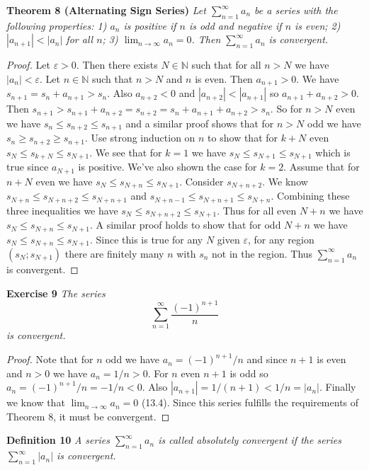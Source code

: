 \documentclass{article}
\begin{document}
\begin{flushleft}
\textbf{Theorem 8 (Alternating Sign Series)}
\textsl{Let $\sum_{n=1}^{\infty} a_n$ be a series with the following properties:
1) $a_n$ is positive if $n$ is odd and negative if $n$ is even;
2) $|a_{n+1}| < |a_n|$ for all $n$;
3) $\lim_{n \rightarrow \infty} a_n = 0$.
Then $\sum_{n=1}^{\infty} a_n$ is convergent.}
\begin{proof}
Let $\varepsilon > 0$. Then there exists $N \in \mathbb{N}$ such that for all $n > N$ we have $|a_n| < \varepsilon$. Let $n \in \mathbb{N}$ such that $n > N$ and $n$ is even. Then $a_{n+1} > 0$. We have $s_{n+1} = s_{n} + a_{n+1} > s_{n}$. Also $a_{n+2} < 0$ and $|a_{n+2}| < |a_{n+1}|$ so $a_{n+1} + a_{n+2} > 0$. Then $s_{n+1} > s_{n+1} + a_{n+2} = s_{n+2} = s_{n} + a_{n+1} + a_{n+2} > s_{n}$. So for $n > N$ even we have $s_{n} \leq s_{n+2} \leq s_{n+1}$ and a similar proof shows that for $n > N$ odd we have $s_{n} \geq s_{n+2} \geq s_{n+1}$. Use strong induction on $n$ to show that for $k + N$ even $s_{N} \leq s_{k+N} \leq s_{N+1}$. We see that for $k=1$ we have $s_N \leq s_{N+1} \leq s_{N+1}$ which is true since $a_{N+1}$ is positive.
We've also shown the case for $k=2$. Assume that for $n+N$ even we have $s_N \leq s_{N+n} \leq s_{N+1}$. Consider $s_{N+n+2}$. We know $s_{N+n} \leq s_{N+n+2} \leq s_{N+n+1}$ and $s_{N+n-1} \leq s_{N+n+1} \leq s_{N+n}$. Combining these three inequalities we have $s_N \leq s_{N+n+2} \leq s_{N+1}$. Thus for all even $N+n$ we have $s_N \leq s_{N+n} \leq s_{N+1}$. A similar proof holds to show that for odd $N+n$ we have $s_{N} \leq s_{N+n} \leq s_{N+1}$. Since this is true for any $N$ given $\varepsilon$, for any region $(s_{N};s_{N+1})$ there are finitely many $n$ with $s_n$ not in the region. Thus $\sum_{n=1}^{\infty} a_n$ is convergent.
\end{proof}

\textbf{Exercise 9}
\textsl{The series
\[
\sum_{n=1}^{\infty} \frac{(-1)^{n+1}}{n}
\]
is convergent.}
\begin{proof}
Note that for $n$ odd we have $a_n = (-1)^{n+1}/n$ and since $n+1$ is even and $n > 0$ we have $a_n = 1/n > 0$. For $n$ even $n+1$ is odd so $a_n = (-1)^{n+1}/n = -1/n < 0$. Also $|a_{n+1}| = 1/(n+1) < 1/n = |a_n|$. Finally we know that $\lim_{n \rightarrow \infty} a_n = 0$ (13.4). Since this series fulfills the requirements of Theorem 8, it must be convergent.
\end{proof}

\textbf{Definition 10}
\textsl{A series $\sum_{n=1}^{\infty} a_n$ is called absolutely convergent if the series $\sum_{n=1}^{\infty} |a_n|$ is convergent.}\newline


\end{flushleft}
\end{document}
